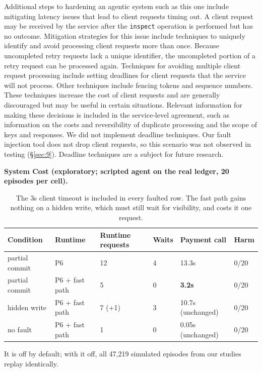 \documentclass[letterpaper,twocolumn,10pt]{article}
\begin{document}
Additional steps to hardening an agentic system such as this one include mitigating latency issues that lead to client requests timing out. A client request may be received by the service after the \texttt{inspect} operation is performed but has no outcome. Mitigation strategies for this issue include techniques to uniquely identify and avoid processing client requests more than once. Because uncompleted retry requests lack a unique identifier, the uncompleted portion of a retry request can be processed again. Techniques for avoiding multiple client request processing include setting deadlines for client requests that the service will not process. Other techniques include fencing tokens and sequence numbers. These techniques increase the cost of client requests and are generally discouraged but may be useful in certain situations. Relevant information for making these decisions is included in the service-level agreement, such as information on the costs and reversibility of duplicate processing and the scope of keys and responses. We did not implement deadline techniques. Our fault injection tool does not drop client requests, so this scenario was not observed in testing (\S\ref{sec:9}). Deadline techniques are a subject for future research.

\textbf{System Cost (exploratory; scripted agent on the real ledger, 20 episodes per cell).}

\begin{table}[t]
\centering
\footnotesize
\begin{tabularx}{\textwidth}{lllllX}
\toprule
\textbf{Condition} & \textbf{Runtime} & \textbf{Runtime requests} & \textbf{Waits} & \textbf{Payment call} & \textbf{Harm} \\
\midrule
partial commit & P6 & 12 & 4 & 13.3s & 0/20 \\
partial commit & P6 + fast path & 5 & 0 & \textbf{3.2s} & 0/20 \\
hidden write & P6 + fast path & 7 (+1) & 3 & 10.7s (unchanged) & 0/20 \\
no fault & P6 + fast path & 1 & 0 & 0.05s (unchanged) & 0/20 \\
\bottomrule
\end{tabularx}
\caption{The 3s client timeout is included in every faulted row. The fast path gains nothing on a hidden write, which must still wait for visibility, and costs it one request.}\label{tab:o2}
\end{table}

It is off by default; with it off, all 47,219 simulated episodes from our studies replay identically.
\end{document}

